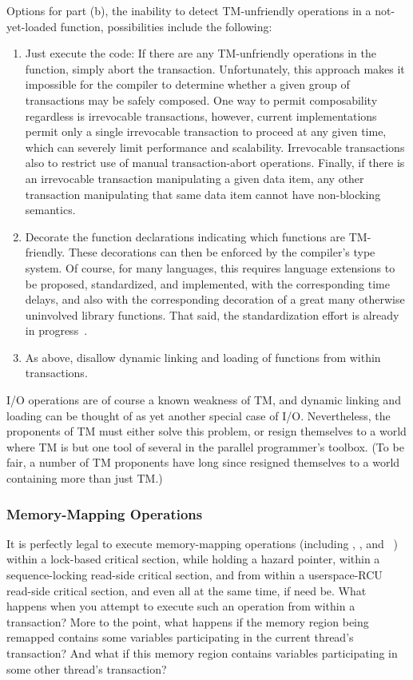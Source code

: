 Options for part (b), the inability to detect TM-unfriendly operations
in a not-yet-loaded function, possibilities include the following:

\begin{enumerate}
\item	Just execute the code:
	If there are any TM-unfriendly operations in the function,
	simply abort the transaction.
	Unfortunately, this approach makes it impossible for the compiler
	to determine whether a given group of transactions may be safely
	composed.
	One way to permit composability regardless is irrevocable
	transactions, however, current implementations permit only a
	single irrevocable transaction to proceed at any given time,
	which can severely limit performance and scalability.
	Irrevocable transactions also to restrict use of manual
	transaction-abort operations.
	Finally, if there is an irrevocable transaction manipulating
	a given data item, any other transaction manipulating that
	same data item cannot have non-blocking semantics.
\item	Decorate the function declarations indicating which functions
	are TM-friendly.
	These decorations can then be enforced by the compiler's type system.
	Of course, for many languages, this requires language extensions
	to be proposed, standardized, and implemented, with the
	corresponding time delays, and also with the corresponding
	decoration of a great many otherwise uninvolved library functions.
	That said, the standardization effort is already in
	progress~\cite{Ali-Reza-Adl-Tabatabai2009CppTM}.
\item	As above, disallow dynamic linking and loading of functions from
	within transactions.
\end{enumerate}

I/O operations are of course a known weakness of TM, and dynamic linking
and loading can be thought of as yet another special case of I/O\@.
Nevertheless, the proponents of TM must either solve this problem, or
resign themselves to a world where TM is but one tool of several in the
parallel programmer's toolbox.
(To be fair, a number of TM proponents have long since resigned themselves
to a world containing more than just TM.)

\subsubsection{Memory-Mapping Operations}
\label{sec:future:Memory-Mapping Operations}

It is perfectly legal to execute memory-mapping operations (including
, , and ~\cite{TheOpenGroup1997SUS})
within a lock-based critical section, while holding a hazard pointer,
within a sequence-locking read-side critical section, and from within a
userspace-RCU read-side critical section, and even all at the same time,
if need be.
What happens when you attempt to execute such an operation from within
a transaction?
More to the point, what happens if the memory region being remapped
contains some variables participating in the current thread's transaction?
And what if this memory region contains variables participating in some
other thread's transaction?

